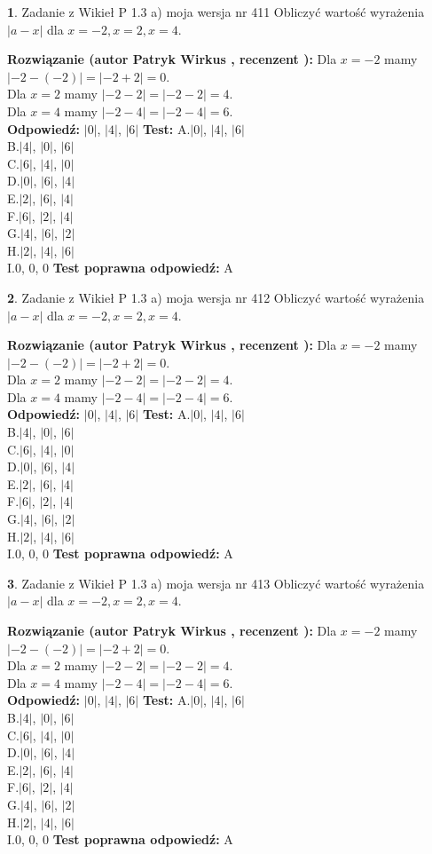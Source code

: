 \documentclass[12pt, a4paper]{article}
\theoremstyle{definition} %
\newtheorem{zad}{}
\newcommand{\zadStart}[1]{\begin{zad}#1\newline}
\newcommand{\zadStop}{\end{zad}}
\newcommand{\rozwStart}[2]{\noindent \textbf{Rozwiązanie (autor #1 , recenzent #2): }\newline}
\newcommand{\rozwStop}{\newline}
\newcommand{\odpStart}{\noindent \textbf{Odpowiedź:}\newline}
\newcommand{\odpStop}{\newline}
\newcommand{\testStart}{\noindent \textbf{Test:}\newline}
\newcommand{\testStop}{\newline}
\newcommand{\kluczStart}{\noindent \textbf{Test poprawna odpowiedź:}\newline}
\newcommand{\kluczStop}{\newline}
\begin{document}
\zadStart{Zadanie z Wikieł P 1.3 a) moja wersja nr 411}
Obliczyć wartość wyrażenia $|a - x|$ dla $x=-2,x=2,x=4$.
\zadStop
\rozwStart{Patryk Wirkus}{}
Dla $x = -2$ mamy $|-2 - (-2)| = |-2 + 2| = 0$.\\
Dla $x = 2$ mamy $|-2 - 2| = |-2 - 2| = 4$.\\
Dla $x = 4$ mamy $|-2 - 4| = |-2 - 4| = 6$.\\
\rozwStop
\odpStart
$|0|$, $|4|$, $|6|$
\odpStop
\testStart
A.$|0|$, $|4|$, $|6|$\\
B.$|4|$, $|0|$, $|6|$\\
C.$|6|$, $|4|$, $|0|$\\
D.$|0|$, $|6|$, $|4|$\\
E.$|2|$, $|6|$, $|4|$\\
F.$|6|$, $|2|$, $|4|$\\
G.$|4|$, $|6|$, $|2|$\\
H.$|2|$, $|4|$, $|6|$\\
I.$0$, $0$, $0$
\testStop
\kluczStart
A
\kluczStop



\zadStart{Zadanie z Wikieł P 1.3 a) moja wersja nr 412}
Obliczyć wartość wyrażenia $|a - x|$ dla $x=-2,x=2,x=4$.
\zadStop
\rozwStart{Patryk Wirkus}{}
Dla $x = -2$ mamy $|-2 - (-2)| = |-2 + 2| = 0$.\\
Dla $x = 2$ mamy $|-2 - 2| = |-2 - 2| = 4$.\\
Dla $x = 4$ mamy $|-2 - 4| = |-2 - 4| = 6$.\\
\rozwStop
\odpStart
$|0|$, $|4|$, $|6|$
\odpStop
\testStart
A.$|0|$, $|4|$, $|6|$\\
B.$|4|$, $|0|$, $|6|$\\
C.$|6|$, $|4|$, $|0|$\\
D.$|0|$, $|6|$, $|4|$\\
E.$|2|$, $|6|$, $|4|$\\
F.$|6|$, $|2|$, $|4|$\\
G.$|4|$, $|6|$, $|2|$\\
H.$|2|$, $|4|$, $|6|$\\
I.$0$, $0$, $0$
\testStop
\kluczStart
A
\kluczStop



\zadStart{Zadanie z Wikieł P 1.3 a) moja wersja nr 413}
Obliczyć wartość wyrażenia $|a - x|$ dla $x=-2,x=2,x=4$.
\zadStop
\rozwStart{Patryk Wirkus}{}
Dla $x = -2$ mamy $|-2 - (-2)| = |-2 + 2| = 0$.\\
Dla $x = 2$ mamy $|-2 - 2| = |-2 - 2| = 4$.\\
Dla $x = 4$ mamy $|-2 - 4| = |-2 - 4| = 6$.\\
\rozwStop
\odpStart
$|0|$, $|4|$, $|6|$
\odpStop
\testStart
A.$|0|$, $|4|$, $|6|$\\
B.$|4|$, $|0|$, $|6|$\\
C.$|6|$, $|4|$, $|0|$\\
D.$|0|$, $|6|$, $|4|$\\
E.$|2|$, $|6|$, $|4|$\\
F.$|6|$, $|2|$, $|4|$\\
G.$|4|$, $|6|$, $|2|$\\
H.$|2|$, $|4|$, $|6|$\\
I.$0$, $0$, $0$
\testStop
\kluczStart
A
\kluczStop
\end{document}

